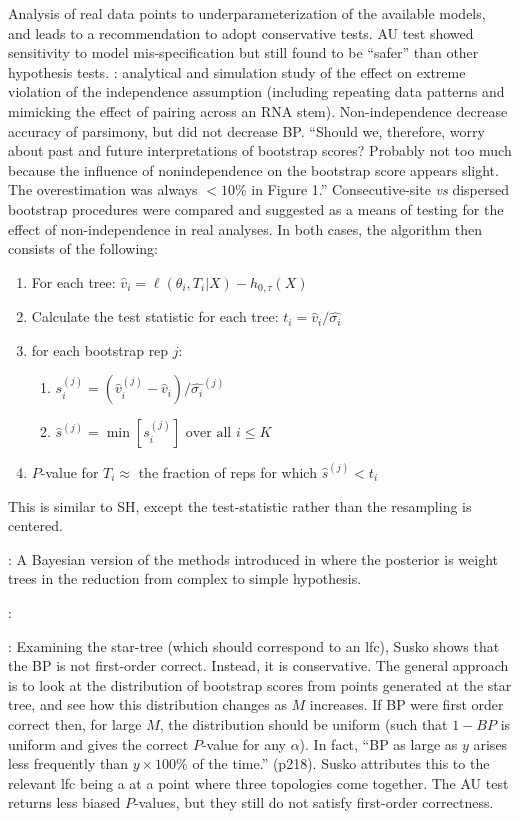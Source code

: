 \documentclass[11pt]{article}
\newcommand{\sdLL}[1]{\hat{\sigma_{#1}}}
\newcommand{\sdLLBoot}[2]{\hat{\sigma_{#1}}^{(#2)}}
\newcommand{\like}{\ell}
\newcommand{\pvalue}{$P$-value\xspace}
\newcommand{\pvalues}{$P$-values\xspace}
\begin{document}
Analysis of real data points to underparameterization of the available models, and leads to a recommendation to adopt conservative tests.
AU test showed sensitivity to model mis-specification but still found to be ``safer'' than other hypothesis tests.
\citet{Galtier2004}: analytical and simulation study of the effect on extreme violation of the independence assumption (including repeating data patterns and mimicking the effect of pairing across an RNA stem).  Non-independence decrease accuracy of parsimony, but did not decrease BP.  ``Should we, therefore, worry about past and future interpretations of bootstrap scores? Probably not too much because the influence of nonindependence on the bootstrap score appears slight. The overestimation was always $<10\%$ in Figure 1.''  Consecutive-site {\em vs} dispersed bootstrap procedures were compared and suggested as a means of testing for the effect of non-independence in real analyses.
In both cases, the algorithm then consists of the following:
\begin{enumerate}
	\item For each tree: $\hat{v}_i = \like(\theta_i,T_i|X) - h_{0,\tau}(X)$
	\item Calculate the test statistic for each tree: $t_i = \hat{v}_i/\sdLL{i}$
	\item for each bootstrap rep $j$:
	\begin{enumerate}
		\item $s_i^{(j)} = \left(\hat{v}_i^{(j)} - \hat{v}_i \right)/\sdLLBoot{i}{j}$
		\item $\hat{s}^{(j)} = \min\left[{s_i^{(j)}}\right] \mbox{ over all } i\leq K$
	\end{enumerate}
	\item \pvalue for $T_i\approx$ the fraction of reps for which $\hat{s}^{(j)} < t_i$
\end{enumerate}

This is similar to SH, except the test-statistic rather than the resampling is centered.

\citet{ArisBrosou2003b}: A Bayesian version of the methods introduced in \citet{ArisBrosou2003} where the posterior is weight trees in the reduction from complex  to simple hypothesis.

\citet{Wrobel2008}:


\citet{Susko2009}: Examining the star-tree (which should correspond to an lfc), Susko shows that \citep[{\em contra}\xspace][]{EfronHH1996} the BP is not first-order correct.
Instead, it is conservative. 
The general approach is to look at the distribution of bootstrap scores from points generated at the star tree, and see how this distribution changes as $M$ increases.
If BP were first order correct then, for large $M$, the distribution should be uniform (such that $1-BP$ is uniform and gives the correct \pvalue for any $\alpha$). 
In fact, ``BP as large as $y$ arises less frequently than $y\times 100\%$ of the time.'' (p218).
Susko attributes this to the relevant lfc being a at a point where three topologies come together. 
The AU test returns less biased \pvalues, but they still do not satisfy first-order correctness.




 
\end{document}
